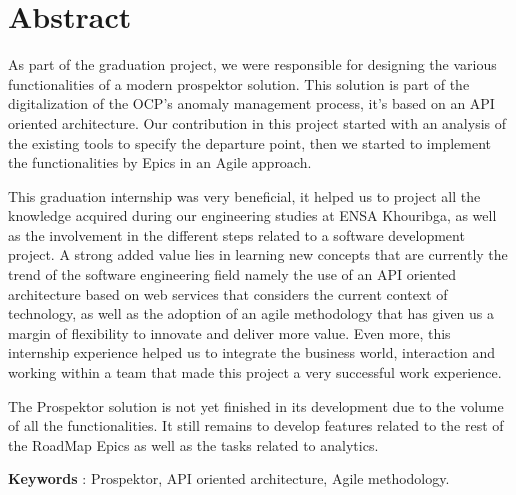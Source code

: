 \chapter*{Abstract}

As part of the graduation project, we were responsible for designing the various functionalities of a modern prospektor solution. This solution is part of the digitalization of the OCP's anomaly management process, it's based on an API oriented architecture. Our contribution in this project started with an analysis of the existing tools to specify the departure point, then we started to implement the functionalities by Epics in an Agile approach.

This graduation internship was very beneficial, it helped us to project all the knowledge acquired during our engineering studies at ENSA Khouribga, as well as the involvement in the different steps related to a software development project. A strong added value lies in learning new concepts that are currently the trend of the software engineering field namely the use of an API oriented architecture based on web services that considers the current context of technology, as well as the adoption of an agile methodology that has given us a margin of flexibility to innovate and deliver more value. Even more, this internship experience helped us to integrate the business world, interaction and working within a team that made this project a very successful work experience.

The Prospektor solution is not yet finished in its development due to the volume of all the functionalities. It still remains to develop features related to the rest of the RoadMap Epics as well as the tasks related to analytics.


\vspace{1.5\baselineskip}

\textbf{Keywords} : Prospektor, API oriented architecture, Agile methodology.